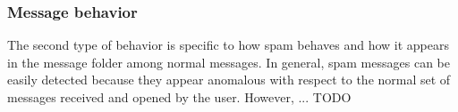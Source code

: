 













\subsubsection{Message behavior}

The second type of behavior is specific to how spam behaves and how it appears in the message folder among normal messages.
In general,
	spam messages can be easily detected because they appear anomalous with respect to the normal set of messages received and opened by the user.
However, ...
TODO









